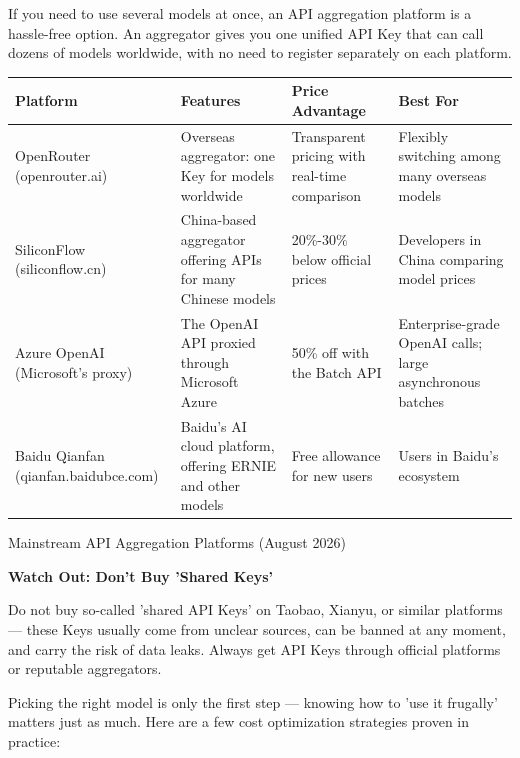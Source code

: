 
If you need to use several models at once, an API aggregation platform is a hassle-free option. An aggregator gives you one unified API Key that can call dozens of models worldwide, with no need to register separately on each platform.

\begin{center}
\begin{tabularx}{\linewidth}{|X|X|X|X|}
\hline
\textbf{Platform} & \textbf{Features} & \textbf{Price Advantage} & \textbf{Best For} \tabularnewline
\hline
OpenRouter (openrouter.ai) & Overseas aggregator: one Key for models worldwide & Transparent pricing with real-time comparison & Flexibly switching among many overseas models \tabularnewline
SiliconFlow (siliconflow.cn) & China-based aggregator offering APIs for many Chinese models & 20\%-30\% below official prices & Developers in China comparing model prices \tabularnewline
Azure OpenAI (Microsoft's proxy) & The OpenAI API proxied through Microsoft Azure & 50\% off with the Batch API & Enterprise-grade OpenAI calls; large asynchronous batches \tabularnewline
Baidu Qianfan (qianfan.baidubce.com) & Baidu's AI cloud platform, offering ERNIE and other models & Free allowance for new users & Users in Baidu's ecosystem \tabularnewline
\hline
\end{tabularx}
\end{center}

\begin{center}\small\color{gray}Mainstream API Aggregation Platforms (August 2026)\end{center}

\textbf{Watch Out: Don't Buy 'Shared Keys'}\par

Do not buy so-called 'shared API Keys' on Taobao, Xianyu, or similar platforms — these Keys usually come from unclear sources, can be banned at any moment, and carry the risk of data leaks. Always get API Keys through official platforms or reputable aggregators.


Picking the right model is only the first step — knowing how to 'use it frugally' matters just as much. Here are a few cost optimization strategies proven in practice:


